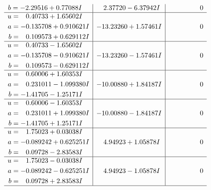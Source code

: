 \documentclass[1p]{elsarticle_modified}
\theoremstyle{definition}
\begin{document}
$$\begin{array}{c|c|c}
\begin{aligned}
b &= -2.29516 + 0.77088 I\end{aligned}
 & \phantom{-}2.37720 - 6.37942 I & \phantom{-0.000000 } 0 \\ \hline\begin{aligned}
u &= \phantom{-}0.40733 + 1.65602 I \\
a &= -0.135708 + 0.910621 I \\
b &= \phantom{-}0.109573 + 0.629112 I\end{aligned}
 & -13.23260 + 1.57461 I & \phantom{-0.000000 } 0 \\ \hline\begin{aligned}
u &= \phantom{-}0.40733 - 1.65602 I \\
a &= -0.135708 - 0.910621 I \\
b &= \phantom{-}0.109573 - 0.629112 I\end{aligned}
 & -13.23260 - 1.57461 I & \phantom{-0.000000 } 0 \\ \hline\begin{aligned}
u &= \phantom{-}0.60006 + 1.60353 I \\
a &= \phantom{-}0.231011 - 1.099380 I \\
b &= -1.41705 - 1.25171 I\end{aligned}
 & -10.00880 + 1.84187 I & \phantom{-0.000000 } 0 \\ \hline\begin{aligned}
u &= \phantom{-}0.60006 - 1.60353 I \\
a &= \phantom{-}0.231011 + 1.099380 I \\
b &= -1.41705 + 1.25171 I\end{aligned}
 & -10.00880 - 1.84187 I & \phantom{-0.000000 } 0 \\ \hline\begin{aligned}
u &= \phantom{-}1.75023 + 0.03038 I \\
a &= -0.089242 + 0.625251 I \\
b &= \phantom{-}0.09728 - 2.83583 I\end{aligned}
 & \phantom{-}4.94923 + 1.05878 I & \phantom{-0.000000 } 0 \\ \hline\begin{aligned}
u &= \phantom{-}1.75023 - 0.03038 I \\
a &= -0.089242 - 0.625251 I \\
b &= \phantom{-}0.09728 + 2.83583 I\end{aligned}
 & \phantom{-}4.94923 - 1.05878 I & \phantom{-0.000000 } 0\\
 \hline 
 \end{array}$$\newpage$$\begin{array}{c|c|c}  

\end{array}$$
\end{document}
